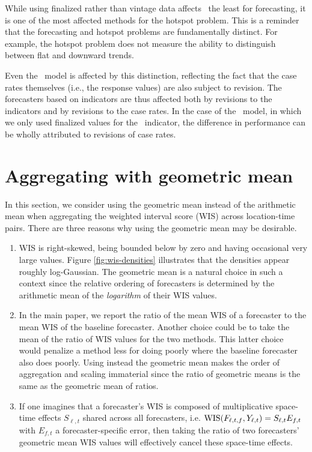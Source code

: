 While using finalized rather than vintage data affects \dv~the least for forecasting,
it is one of the most affected methods for the
hotspot problem. 
This is a reminder that the forecasting and hotspot problems are fundamentally
distinct.  For example, the hotspot problem does not measure
the ability to distinguish between flat and downward trends.

Even the \ar~model is affected by this distinction, reflecting the
fact that the case rates themselves (i.e., the response values) are also
subject to revision.  The forecasters based on indicators are thus
affected both by revisions to the indicators and by revisions to the
case rates.  In the case of the \gs~model, in which we only used finalized
values for the \gs~indicator, the difference in performance can be
wholly attributed to revisions of case rates.




\section{Aggregating with geometric mean}

In this section, we consider using the geometric mean instead of the
arithmetic mean when aggregating the weighted interval score (WIS) across
location-time pairs. 
There are three reasons why using the geometric mean may be desirable.
\begin{enumerate}
\item  WIS is right-skewed, being bounded below by zero and having
  occasional very large values.   Figure \ref{fig:wis-densities} illustrates that the
  densities appear roughly log-Gaussian.  The geometric mean is a
  natural choice in such a context since the relative ordering of forecasters is
  determined by the arithmetic mean of the {\em logarithm} of their WIS
  values.
\item In the main paper, we report the ratio of the mean WIS of a
  forecaster to the mean WIS of the baseline forecaster. Another
  choice could be to take the mean of the ratio of WIS values for the
  two methods. This latter choice would penalize a method less for
  doing poorly where the baseline forecaster also does poorly.
  Using instead the geometric mean makes the order of aggregation and
  scaling immaterial since the ratio of geometric means is the same as
  the geometric mean of ratios.
\item If one imagines that a forecaster's WIS is composed of
  multiplicative space-time effects $S_{\ell,t}$ shared across all forecasters,
  i.e. $\mathrm{WIS}(F_{\ell,t,f},Y_{\ell,t})=S_{\ell,t}E_{f,t}$ with $E_{f,t}$ a
  forecaster-specific error, then
  taking the ratio of two forecasters' geometric mean WIS values will
  effectively cancel these space-time effects.
\end{enumerate}

